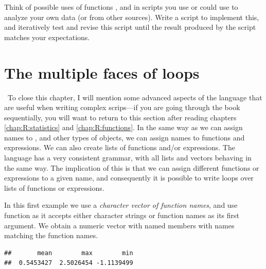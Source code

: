 \documentclass[krantz2]{krantz}\usepackage{knitr}
\begin{document}
\begin{advplayground}
Think of possible uses of functions ,  and  in scripts you use or could use to analyze your own data (or from other sources). Write a script to implement this, and iteratively test and revise this script until the result produced by the script matches your expectations.
\end{advplayground}

\section{The multiple faces of loops}\label{sec:R:faces:of:loops}

\ilAdvanced\ To close this chapter, I will mention some advanced aspects of the \Rlang language that are useful when writing complex scrips---if you are going through the book sequentially, you will want to return to this section after reading chapters \ref{chap:R:statistics} and \ref{chap:R:functions}. In the same way as we can assign names to ,  and other types of objects, we can assign names to functions and expressions. We can also create lists of functions and/or expressions. The \Rlang language has a very consistent grammar, with all lists and vectors behaving in the same way. The implication of this is that we can assign different functions or expressions to a given name, and consequently it is possible to write loops over lists of functions or expressions.

In this first example we use a \emph{character vector of function names}, and use function  as it accepts either character strings or function names as its first argument. We obtain a numeric vector with named members with names matching the function names.

\begin{knitrout}\footnotesize
{}\color{fgcolor}\begin{kframe}
\begin{alltt}
 \hlkwb{<-} \hlstd{(}\hlstd{)}
 \hlkwb{<-} \hlstd{()}
 \hlkwb{<-} \hlstd{(}\hlstd{,} \hlstd{,} \hlstd{)}
   
    \hlkwb{<-}  
   \hlstd{\}}
\end{alltt}
\begin{verbatim}
##       mean        max        min
##  0.5453427  2.5026454 -1.1139499
\end{verbatim}
\end{kframe}
\end{knitrout}
\end{document}
